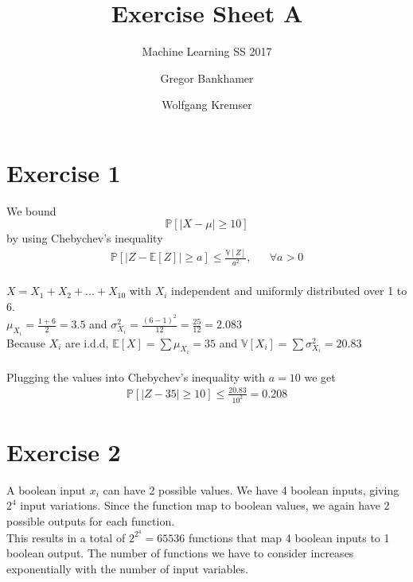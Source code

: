 \documentclass[12pt]{scrartcl}
\begin{document}
		
\title{Exercise Sheet A}
\subtitle{Machine Learning SS 2017}
\author{Gregor Bankhamer \and Wolfgang Kremser}
\date{}
\maketitle


\section*{Exercise 1}
We bound 
\begin{equation*}
	\mathbb{P}[|X-\mu| \geq 10]
\end{equation*}
by using Chebychev's inequality
\begin{equation*} 
	\begin{aligned}
		 \mathbb{P}[|Z - \mathbb{E}[Z]| \geq a] \leq \frac{\mathbb{V}[Z]}{a^2}, &&\forall a > 0
	\end{aligned}
\end{equation*}
\\
$X = X_1 + X_2 + ... + X_{10}$ with $X_i$ independent and uniformly distributed over 1 to 6.\\
$\mu_{X_i} = \frac{1+6}{2} = 3.5$ and $\sigma^2_{X_i} = \frac{(6-1)^2}{12} = \frac{25}{12} = 2.083$\\

\noindent Because $X_i$ are i.d.d, $\mathbb{E}[X] = \sum \mu_{X_i} = 35$ and $\mathbb{V}[X_i] = \sum \sigma^2_{X_i} = 20.83$\\
\\
Plugging the values into Chebychev's inequality with $a=10$ we get
\begin{equation*} 
\begin{aligned}
\mathbb{P}[|Z - 35| \geq 10] \leq \frac{20.83}{10^2} = 0.208
\end{aligned}
\end{equation*}

\section*{Exercise 2}
A boolean input $x_i$ can have 2 possible values. We have 4 boolean inputs, giving $2^4$ input variations. Since the function map to boolean values, we again have 2 possible outputs for each function. \\
This results in a total of $2^{2^4} = 65536$ functions that map 4 boolean inputs to 1 boolean output. The number of functions we have to consider increases exponentially with the number of input variables.
\end{document}
